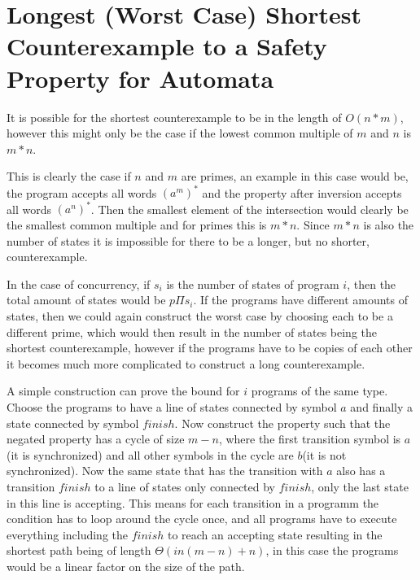 \section{Longest (Worst Case) Shortest Counterexample to a Safety Property for Automata}
It is possible for the shortest counterexample to be in the length of $O(n*m)$, however this might only be the case if the lowest common multiple of $m$ and $n$ is $m*n$. 

This is clearly the case if $n$ and $m$ are primes, an example in this case would be, the program accepts all words $(a^m)^*$ and the property after inversion accepts all words $(a^n)^*$. Then the smallest element of the intersection would clearly be the smallest common multiple and for primes this is $m*n$. Since $m*n$ is also the number of states it is impossible for there to be a longer, but no shorter, counterexample. 

In the case of concurrency, if $s_i$ is the number of states of program $i$, then the total amount of states would be $p \Pi s_i$. If the programs have different amounts of states, then we could again construct the worst case by choosing each to be a different prime, which would then result in the number of states being the shortest counterexample, however if the programs have to be copies of each other it becomes much more complicated to construct a long counterexample.

A simple construction can prove the bound for $i$ programs of the same type. Choose the programs to have a line of states connected by symbol $a$ and finally a state connected by symbol $finish$.
Now construct the property such that the negated property has a cycle of size $m-n$, where the first transition symbol is $a$(it is synchronized) and all other symbols in the cycle are $b$(it is not synchronized). Now the same state that has the transition with $a$ also has a transition $finish$ to a line of states only connected by $finish$, only the last state in this line is accepting. This means for each transition in a programm the condition has to loop around the cycle once, and all programs have to execute everything including the $finish$ to reach an accepting state resulting in the shortest path being of length $\Theta(i n (m-n)+n)$, in this case the programs would be a linear factor on the size of the path.
